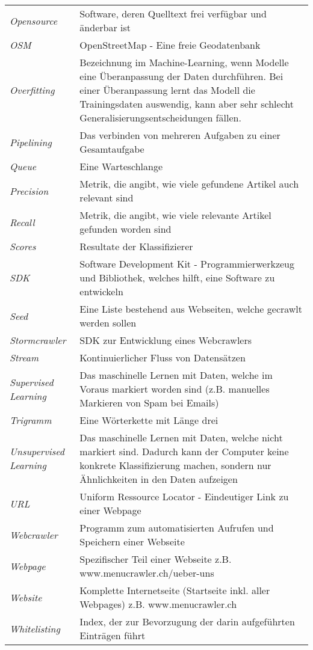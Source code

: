 \begin{table}[H]
	\begin{tabular}{>{\em}p{4cm}p{12cm}}
		Opensource & Software, deren Quelltext frei verfügbar und änderbar ist\\
		OSM & OpenStreetMap - Eine freie Geodatenbank\\
		Overfitting & Bezeichnung im Machine-Learning, wenn Modelle eine Überanpassung der Daten durchführen. Bei einer Überanpassung lernt das Modell die Trainingsdaten auswendig, kann aber sehr schlecht Generalisierungsentscheidungen fällen.\\
		Pipelining & Das verbinden von mehreren Aufgaben zu einer Gesamtaufgabe\\
		Queue & Eine Warteschlange\\
		Precision & Metrik, die angibt, wie viele gefundene Artikel auch relevant sind\\
		Recall & Metrik, die angibt, wie viele relevante Artikel gefunden worden sind\\
		Scores & Resultate der Klassifizierer\\
		SDK & Software Development Kit - Programmierwerkzeug und Bibliothek, welches hilft, eine Software zu entwickeln\\
		Seed & Eine Liste bestehend aus Webseiten, welche gecrawlt werden sollen\\
		Stormcrawler & SDK zur Entwicklung eines Webcrawlers\\
		Stream & Kontinuierlicher Fluss von Datensätzen\\
		Supervised Learning & Das maschinelle Lernen mit Daten, welche im Voraus markiert worden sind (z.B. manuelles Markieren von Spam bei Emails)\\
		Trigramm & Eine Wörterkette mit Länge drei\\
		Unsupervised Learning & Das maschinelle Lernen mit Daten, welche nicht markiert sind. Dadurch kann der Computer keine konkrete Klassifizierung machen, sondern nur Ähnlichkeiten in den Daten aufzeigen\\
		URL & Uniform Ressource Locator - Eindeutiger Link zu einer Webpage\\
		Webcrawler & Programm zum automatisierten Aufrufen und Speichern einer Webseite\\
		Webpage & Spezifischer Teil einer Webseite z.B. www.menucrawler.ch/ueber-uns\\
		Website & Komplette Internetseite (Startseite inkl. aller Webpages) z.B. www.menucrawler.ch\\
		Whitelisting & Index, der zur Bevorzugung der darin aufgeführten Einträgen führt\\	
	\end{tabular}
\end{table}
